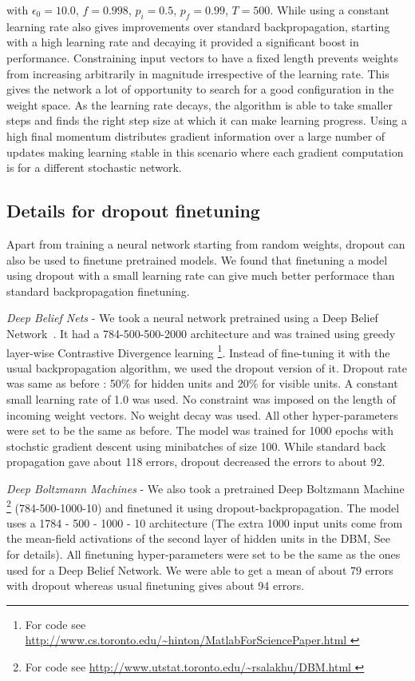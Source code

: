 \documentclass[12pt]{article}
\begin{document}
with $\epsilon_0 = 10.0$, $f = 0.998$, $p_{i} = 0.5$, $p_{f} = 0.99$, $T = 500$.
While using a constant learning rate also gives improvements over standard
backpropagation, starting with a high learning rate and decaying it provided a
significant boost in performance. Constraining input vectors to have a fixed
length prevents weights from increasing arbitrarily in magnitude
irrespective of the learning rate. This gives the network a lot of opportunity
to search for a good configuration in the weight space. As the learning rate
decays, the algorithm is able to take smaller steps and finds the right step size
at which it can make learning progress. Using a high final momentum distributes
gradient information over a large number of updates making learning
stable in this scenario where each gradient computation is for a different
stochastic network.

\subsection{Details for dropout finetuning}
\label{sec:mnist_dropout_pre}
Apart from training a neural network starting from random weights, dropout can
also be used to finetune pretrained models. We found that finetuning a
model using dropout with a small learning rate can give much better performace
than standard backpropagation finetuning.

\emph{Deep Belief Nets} - We took a neural network pretrained using a Deep Belief Network~\cite{Science}.
It had a 784-500-500-2000 architecture and was trained using greedy layer-wise
Contrastive Divergence learning
\footnote{For code see \url{http://www.cs.toronto.edu/~hinton/MatlabForSciencePaper.html } }. Instead of fine-tuning it
with the usual backpropagation algorithm, we used the dropout version of it.
Dropout rate was same as before : 50\% for hidden units and 20\% for
visible units. A constant small learning rate of 1.0 was used. No constraint was imposed on
the length of incoming weight vectors. No weight decay was used. All other
hyper-parameters were set to be the same as before. The model was trained for 1000 epochs
with stochstic gradient descent using minibatches of size 100. While standard
back propagation gave about 118 errors, dropout decreased the errors to about 92.

\emph{Deep Boltzmann Machines} - We also took a pretrained Deep Boltzmann
Machine \cite{DBM} \footnote{ For code see
\url{http://www.utstat.toronto.edu/~rsalakhu/DBM.html }}
(784-500-1000-10) and finetuned it using dropout-backpropagation. The
model uses a 1784 - 500 - 1000 - 10 architecture (The extra 1000 input
units come from the mean-field activations of the second layer of hidden units
in the DBM, See~\cite{DBM} for details).
All finetuning hyper-parameters were set to be the same as the ones used for a Deep Belief Network.
We were able to get a mean of about 79 errors with dropout whereas usual finetuning gives about 94 errors.
\end{document}
